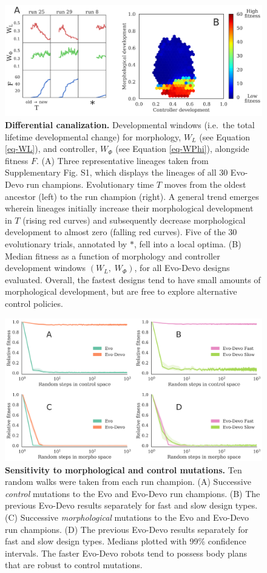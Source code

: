 \begin{figure}[t]
\centering
\includegraphics[width=\linewidth]{Chapter04/Fig4}
\caption{\label{fig-correlation}\textbf{Differential canalization.} 
Developmental windows (i.e.~the total lifetime developmental change) for morphology, $W_L$ (see Equation \ref{eq-WL}), and controller, $W_{\Phi}$ (see Equation \ref{eq-WPhi}), alongside fitness $F$.
(A) Three representative lineages taken from Supplementary Fig. S1, which displays the lineages of all 30 Evo-Devo run champions. Evolutionary time $T$ moves from the oldest ancestor (left) to the run champion (right). A general trend emerges wherein lineages initially increase their morphological development in $T$ (rising red curves) and subsequently decrease morphological development to almost zero (falling red curves). Five of the 30 evolutionary trials, annotated by {\Large $\ast$}, fell into a local optima.
(B) Median fitness as a function of morphology and controller development windows $(W_L,\; W_{\Phi})$, for all Evo-Devo designs evaluated. 
Overall, the fastest designs tend to have small amounts of morphological development, but are free to explore alternative control policies.}
\end{figure}

\begin{figure}[t]
\centering
\includegraphics[width=\linewidth]{Chapter04/Fig5}
\caption{\label{fig-random-walks}\textbf{Sensitivity to morphological and control mutations.}
Ten random walks were taken from each run champion.
(A) Successive \textit{control} mutations to the Evo and Evo-Devo run champions.
(B) The previous Evo-Devo results separately for fast and slow design types.
(C) Successive \textit{morphological} mutations to the Evo and Evo-Devo run champions.
(D) The previous Evo-Devo results separately for fast and slow design types. Medians plotted with 99\% confidence intervals.
The faster Evo-Devo robots tend to possess body plans that are robust to control mutations.}
\end{figure}

